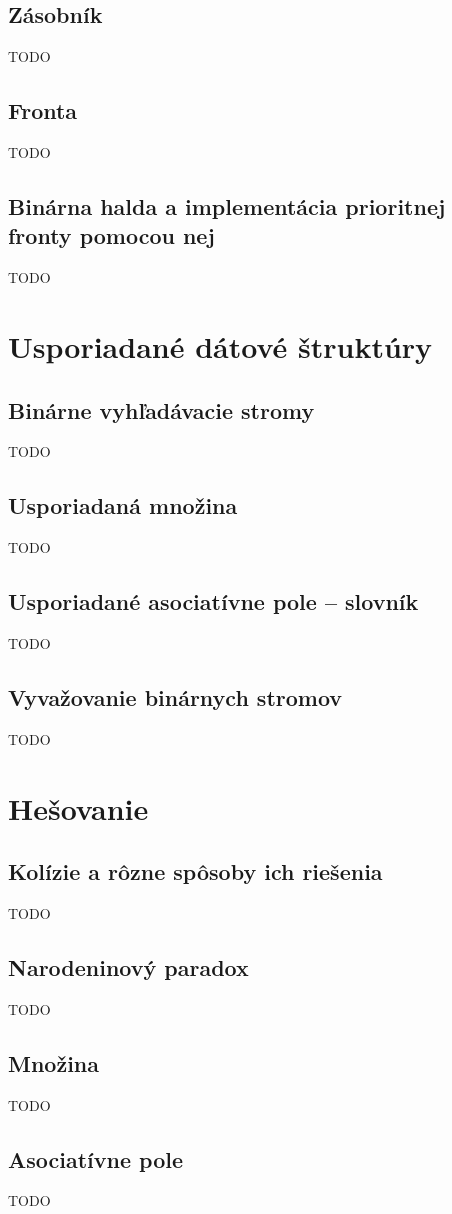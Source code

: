	\subsection{Zásobník} TODO
	\subsection{Fronta} TODO
	\subsection{Binárna halda a implementácia prioritnej fronty pomocou nej} TODO

\section{Usporiadané dátové štruktúry}
	\subsection{Binárne vyhľadávacie stromy} TODO
	\subsection{Usporiadaná množina} TODO
	\subsection{Usporiadané asociatívne pole – slovník} TODO
	\subsection{Vyvažovanie binárnych stromov} TODO

\section{Hešovanie}

	\subsection{Kolízie a rôzne spôsoby ich riešenia} TODO
	\subsection{Narodeninový paradox} TODO
	\subsection{Množina} TODO
	\subsection{Asociatívne pole} TODO

